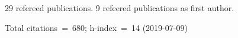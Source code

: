 29 refereed publications. 9 refeered publications as first author.

Total citations~=~680; h-index~=~14 (2019-07-09)
